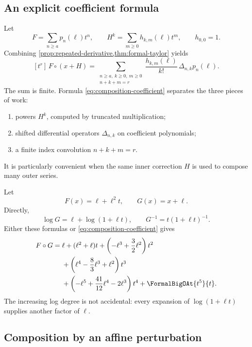 \documentclass[11pt,oneside]{article}
\numberwithin{equation}{section}
\theoremstyle{definition}
\newcommand{\TransseriesCoefficientOf}[2]{\left[#1\right]\,#2}
\begin{document}
\subsection{An explicit coefficient formula}

Let
\begin{equation}\label{eq:F-H-components}
 F=\sum_{n\ge a}p_n(\ell)t^n,
 \qquad
 H^k=\sum_{m\ge0}h_{k,m}(\ell)t^m,
 \qquad h_{0,0}=1.
\end{equation}
Combining \cref{prop:repeated-derivative,thm:formal-taylor} yields
\begin{equation}\label{eq:composition-coefficient}
\boxed{
  \TransseriesCoefficientOf{t^r}{F\circ(x+H)}
  =\sum_{\substack{n\ge a,\ k\ge0,\ m\ge0\\n+k+m=r}}
    \frac{h_{k,m}(\ell)}{k!}\,\Delta_{n,k}p_n(\ell).
}
\end{equation}
The sum is finite.  Formula \eqref{eq:composition-coefficient} separates the
three pieces of work:
\begin{enumerate}
\item powers \(H^k\), computed by truncated multiplication;
\item shifted differential operators \(\Delta_{n,k}\) on coefficient
  polynomials;
\item a finite index convolution \(n+k+m=r\).
\end{enumerate}
It is particularly convenient when the same inner correction \(H\) is used to
compose many outer series.

\begin{examplebox}
Let
\[
  F(x)=\ell+\ell^2t,
  \qquad G(x)=x+\ell.
\]
Directly,
\[
  \log G=\ell+\log(1+\ell t),
  \qquad G^{-1}=t(1+\ell t)^{-1}.
\]
Either these formulas or \eqref{eq:composition-coefficient} gives
\begin{align*}
 F\circ G={}&\ell+(\ell^2+\ell)t
 +\left(-\ell^3+\frac32\ell^2\right)t^2\\
 &+\left(\ell^4-\frac83\ell^3+\ell^2\right)t^3\\
 &+\left(-\ell^5+\frac{41}{12}\ell^4-2\ell^3\right)t^4
 +\FormalBigOAt{t^5}{t}.
\end{align*}
The increasing log degree is not accidental: every expansion of
\(\log(1+\ell t)\) supplies another factor of \(\ell\).
\end{examplebox}

\subsection{Composition by an affine perturbation}
\end{document}
